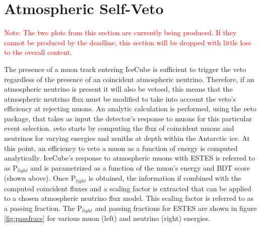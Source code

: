 \documentclass{PoS}
\begin{document}
\iffalse

\section{Atmospheric Self-Veto}\label{sec:nuveto}

\textcolor{red}{Note: The two plots from this section are currently being produced. If they cannot be produced by the deadline, this section will be dropped with little loss to the overall content.}

The presence of a muon track entering IceCube is sufficient to trigger the veto regardless of the presence of an coincident atmospheric neutrino. Therefore, if an atmospheric neutrino is present it will also be vetoed, this means that the atmospheric neutrino flux must be modified to take into account the veto's efficiency at rejecting muons. An analytic calculation is performed, using the $\nu$eto\cite{Arg_elles_2018} package, that takes as input the detector's response to muons for this particular event selection. $\nu$eto starts by computing the flux of coincident muons and neutrinos for varying energies and zeniths at depth within the Antarctic ice. At this point, an efficiency to veto a muon as a function of energy is computed analytically. IceCube's response to atmospheric muons with ESTES is referred to as P$_{light}$ and is parametrized as a function of the muon's energy and BDT score (shown above). Once P$_{light}$ is obtained, the information if combined with the computed coincident fluxes and a scaling factor is extracted that can be applied to a chosen atmospheric neutrino flux model. This scaling factor is referred to as a passing fraction. The P$_{light}$ and passing fractions for ESTES are shown in figure \ref{fig:passfracs} for various muon (left) and neutrino (right) energies.
\end{document}
